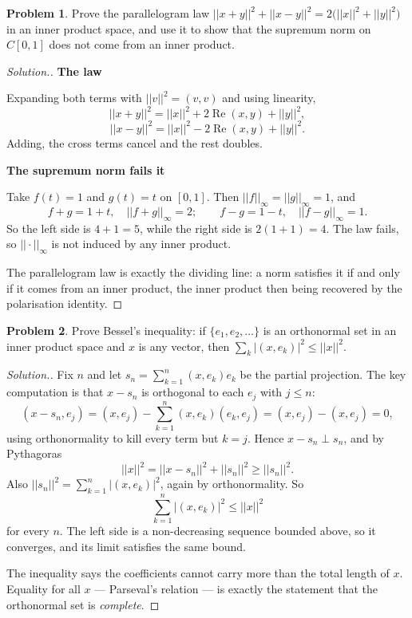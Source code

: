 \documentclass[11pt,a4paper]{article}
\theoremstyle{definition}
\newtheorem{problemx}{Problem}[section]
\newenvironment{problem}{\begin{problemx}}{\end{problemx}}
\newenvironment{solution}
  {\renewcommand{\qedsymbol}{}\begin{proof}[\textit{Solution}.]}
  {\end{proof}}
\newcommand{\subhead}[1]{%
  \par\medskip\noindent\textbf{#1}\par\nobreak\smallskip}
\begin{document}
\begin{problem}
Prove the parallelogram law
$||x+y||^2+||x-y||^2=2\big(||x||^2+||y||^2\big)$ in an inner product space, and
use it to show that the supremum norm on $C[0,1]$ does not come from an inner
product.
\end{problem}
\begin{solution}
\subhead{The law}
Expanding both terms with $||v||^2=(v,v)$ and using linearity,
$$||x+y||^2=||x||^2+2\operatorname{Re}(x,y)+||y||^2,$$
$$||x-y||^2=||x||^2-2\operatorname{Re}(x,y)+||y||^2 .$$
Adding, the cross terms cancel and the rest doubles.

\subhead{The supremum norm fails it}
Take $f(t)=1$ and $g(t)=t$ on $[0,1]$. Then $||f||_\infty=||g||_\infty=1$, and
$$f+g=1+t,\quad ||f+g||_\infty=2;\qquad f-g=1-t,\quad ||f-g||_\infty=1 .$$
So the left side is $4+1=5$, while the right side is $2(1+1)=4$. The law fails,
so $||\cdot||_\infty$ is not induced by any inner product.

The parallelogram law is exactly the dividing line: a norm satisfies it if and
only if it comes from an inner product, the inner product then being recovered
by the polarisation identity.
\end{solution}

\begin{problem}
Prove Bessel's inequality: if $\{e_1,e_2,\dots\}$ is an orthonormal set in an
inner product space and $x$ is any vector, then
$\sum_k |(x,e_k)|^2\leq ||x||^2$.
\end{problem}
\begin{solution}
Fix $n$ and let $s_n=\sum_{k=1}^{n}(x,e_k)e_k$ be the partial projection. The
key computation is that $x-s_n$ is orthogonal to each $e_j$ with $j\leq n$:
$$(x-s_n,e_j)=(x,e_j)-\sum_{k=1}^{n}(x,e_k)(e_k,e_j)=(x,e_j)-(x,e_j)=0 ,$$
using orthonormality to kill every term but $k=j$. Hence $x-s_n\perp s_n$, and
by Pythagoras
$$||x||^2=||x-s_n||^2+||s_n||^2\geq ||s_n||^2 .$$
Also $||s_n||^2=\sum_{k=1}^{n}|(x,e_k)|^2$, again by orthonormality. So
$$\sum_{k=1}^{n}|(x,e_k)|^2\leq ||x||^2$$
for every $n$. The left side is a non-decreasing sequence bounded above, so it
converges, and its limit satisfies the same bound.

The inequality says the coefficients cannot carry more than the total length of
$x$. Equality for all $x$ --- Parseval's relation --- is exactly the statement
that the orthonormal set is \emph{complete}.
\end{solution}
\end{document}
